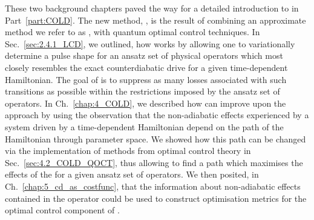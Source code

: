 These two background chapters paved the way for a detailed introduction to  in Part~\ref{part:COLD}. The new method, , is the result of combining an approximate  method we refer to as  \cite{sels_minimizing_2017}, with quantum optimal control techniques. In Sec.~\ref{sec:2.4.1_LCD}, we outlined, how  works by allowing one to variationally determine a pulse shape for an ansatz set of physical operators which most closely resembles the exact counterdiabatic drive for a given time-dependent Hamiltonian. The goal of  is to suppress as many losses associated with such transitions as possible within the restrictions imposed by the ansatz set of operators. In Ch.~\ref{chap:4_COLD}, we described how  can improve upon the  approach by using the observation that the non-adiabatic effects experienced by a system driven by a time-dependent Hamiltonian depend on the path of the Hamiltonian through parameter space. We showed how this path can be changed via the implementation of methods from optimal control theory in Sec.~\ref{sec:4.2_COLD_QOCT}, thus allowing  to find a path which maximises the effects of the  for a given ansatz set of operators. We then posited, in Ch.~\ref{chap:5_cd_as_costfunc}, that the information about non-adiabatic effects contained in the  operator could be used to construct optimisation metrics for the optimal control component of .

